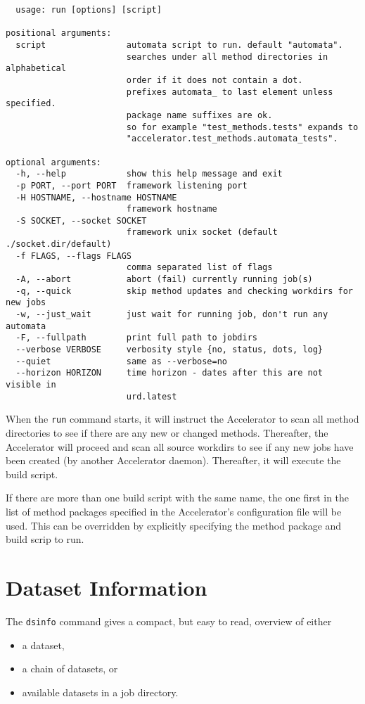 \begin{snugshade}
\begin{verbatim}
  usage: run [options] [script]

positional arguments:
  script                automata script to run. default "automata".
                        searches under all method directories in alphabetical
                        order if it does not contain a dot.
                        prefixes automata_ to last element unless specified.
                        package name suffixes are ok.
                        so for example "test_methods.tests" expands to
                        "accelerator.test_methods.automata_tests".

optional arguments:
  -h, --help            show this help message and exit
  -p PORT, --port PORT  framework listening port
  -H HOSTNAME, --hostname HOSTNAME
                        framework hostname
  -S SOCKET, --socket SOCKET
                        framework unix socket (default ./socket.dir/default)
  -f FLAGS, --flags FLAGS
                        comma separated list of flags
  -A, --abort           abort (fail) currently running job(s)
  -q, --quick           skip method updates and checking workdirs for new jobs
  -w, --just_wait       just wait for running job, don't run any automata
  -F, --fullpath        print full path to jobdirs
  --verbose VERBOSE     verbosity style {no, status, dots, log}
  --quiet               same as --verbose=no
  --horizon HORIZON     time horizon - dates after this are not visible in
                        urd.latest
\end{verbatim}
\end{snugshade}
When the \texttt{run} command starts, it will instruct the Accelerator
to scan all method directories to see if there are any new or changed
methods.  Thereafter, the Accelerator will proceed and scan all source
workdirs to see if any new jobs have been created (by another
Accelerator daemon).  Thereafter, it will execute the build script.

If there are more than one build script with the same name, the one
first in the list of method packages specified in the Accelerator's
configuration file will be used.  This can be overridden by explicitly
specifying the method package and build scrip to run.





\section{Dataset Information}
The \texttt{dsinfo} command gives a compact, but easy to read,
overview of either
\begin{itemize}
\item[] a dataset,
\item[] a chain of datasets, or
\item[] available datasets in a job directory.
\end{itemize}

